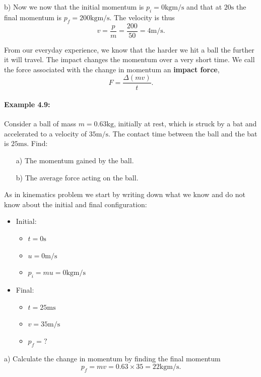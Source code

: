 \documentclass[a4paper,12pt]{book}
\begin{document}
b) Now we now that the initial momentum is $p_{i}=0\text{kgm/s}$ and that at $20\text{s}$ the final momentum is $p_{f}=200\text{kgm/s}$. The velocity is thus
\begin{equation*}
v=\frac{p}{m}=\frac{200}{50}=4\text{m/s}.
\end{equation*}

From our everyday experience, we know that the harder we hit a ball the further it will travel. The impact changes the momentum over a very short time. We call the force associated with the change in momentum an \textbf{impact force},
\begin{equation*}
F=\frac{\Delta\left(mv\right)}{t}.
\end{equation*}

\paragraph{Example 4.9:} Consider a ball of mass $m=0.63\text{kg}$, initially at rest, which is struck by a bat and accelerated to a velocity of $35\text{m/s}$. The  contact time between the ball and the bat is $25\text{ms}$. Find:
\begin{itemize}
\setlength{\itemsep}{-5pt}
    \item[a)] The momentum gained by the ball.
    \item[b)] The average force acting on the ball.
\end{itemize} 
As in kinematics problem we start by writing down what we know and do not know about the initial and final configuration:
\begin{itemize}
\setlength{\itemsep}{-5pt}
    \item Initial:
    \begin{itemize}
\setlength{\itemsep}{-5pt}
    \item $t=0\text{s}$
    \item $u=0\text{m/s}$
    \item $p_{i}=mu=0\text{kgm/s}$
\end{itemize} 
    \item Final:
    \begin{itemize}
\setlength{\itemsep}{-5pt}
    \item $t=25\text{ms}$
    \item $v=35\text{m/s}$
    \item $p_{f}=?$
\end{itemize} 
\end{itemize} 
a) Calculate the change in momentum by finding the final momentum
\begin{equation*}
p_{f}=mv=0.63\times 35 =22\text{kgm/s}.
\end{equation*}
\end{document}
